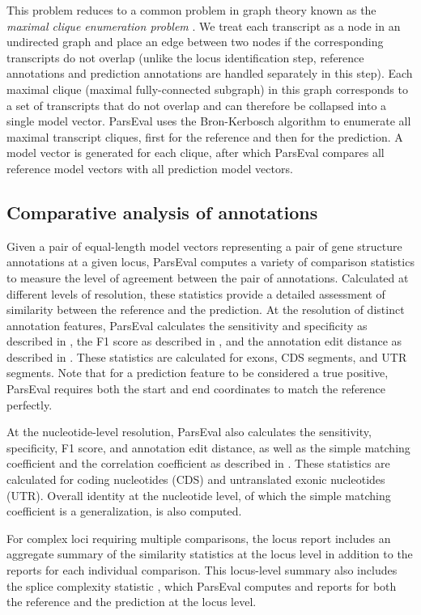 This problem reduces to a common problem in graph theory known as the \emph{maximal clique enumeration problem} \citep{Bron}.
We treat each transcript as a node in an undirected graph and place an edge between two nodes if the corresponding transcripts do not overlap (unlike the locus identification step, reference annotations and prediction annotations are handled separately in this step).
Each maximal clique (maximal fully-connected subgraph) in this graph corresponds to a set of transcripts that do not overlap and can therefore be collapsed into a single model vector.
ParsEval uses the Bron-Kerbosch algorithm \citep{Bron} to enumerate all maximal transcript cliques, first for the reference and then for the prediction.
A model vector is generated for each clique, after which ParsEval compares all reference model vectors with all prediction model vectors.


\subsection{Comparative analysis of annotations}
Given a pair of equal-length model vectors representing a pair of gene structure annotations at a given locus, ParsEval computes a variety of comparison statistics to measure the level of agreement between the pair of annotations.
Calculated at different levels of resolution, these statistics provide a detailed assessment of similarity between the reference and the prediction.
At the resolution of distinct annotation features, ParsEval calculates the sensitivity and specificity as described in  \citep{Burset}, the F1 score as described in  \citep{Zhao}, and the annotation edit distance as described in  \citep{Eilbeck,Holt}.
These statistics are calculated for exons, CDS segments, and UTR segments.
Note that for a prediction feature to be considered a true positive, ParsEval requires both the start and end coordinates to match the reference perfectly.

At the nucleotide-level resolution, ParsEval also calculates the sensitivity, specificity, F1 score, and annotation edit distance, as well as the simple matching coefficient and the correlation coefficient as described in  \citep{Burset}.
These statistics are calculated for coding nucleotides (CDS) and untranslated exonic nucleotides (UTR).
Overall identity at the nucleotide level, of which the simple matching coefficient is a generalization, is also computed.

For complex loci requiring multiple comparisons, the locus report includes an aggregate summary of the similarity statistics at the locus level in addition to the reports for each individual comparison.
This locus-level summary also includes the splice complexity statistic \citep{Eilbeck}, which ParsEval computes and reports for both the reference and the prediction at the locus level.

